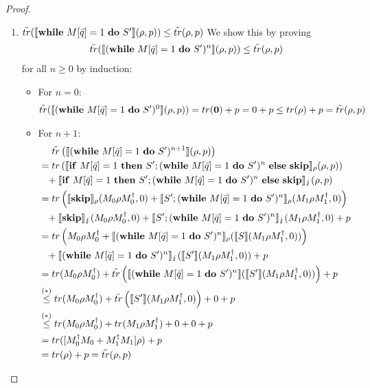 \documentclass[a4paper,UKenglish,cleveref, autoref, thm-restate]{lipics-v2021}
\begin{document}
\begin{proof}
\begin{itemize}
\begin{enumerate}
            \item $\tilde{tr}(\llbracket \mathbf{while } \text{ }M[\Bar{q}]=1 \text{ }\mathbf{ do } \text{ }S' \rrbracket(\rho,p))\leq \tilde{tr}(\rho,p)$ We show this by proving
            \begin{align*}
                \tilde{tr}(\llbracket (\mathbf{while } \text{ }M[\Bar{q}]=1 \text{ }\mathbf{ do } \text{ }S')^n \rrbracket(\rho,p)) \leq \tilde{tr}(\rho,p)
            \end{align*} for all $n\geq 0$ by induction:
            \begin{itemize}
                \item For $n=0$:
                \begin{align*}
                    \tilde{tr}(\llbracket (\mathbf{while } \text{ }M[\Bar{q}]=1 \text{ }\mathbf{ do } \text{ }S')^0 \rrbracket(\rho,p)) = tr(\mathbf{0}) + p =0+ p\leq tr(\rho)+p = \tilde{tr}(\rho,p)
                \end{align*}
                \item For $n+1$:
                \begin{align*}
                    &\phantom{=.}\tilde{tr}\left(\llbracket (\mathbf{while } \text{ }M[\Bar{q}]=1 \text{ }\mathbf{ do } \text{ }S')^{n+1} \rrbracket(\rho,p)\right)  \\
                    &= tr\left(\llbracket \mathbf{if} \text{ }M[\Bar{q}]=1 \text{ } \mathbf{then} \text{ } S'; (\mathbf{while } \text{ }M[\Bar{q}]=1 \text{ }\mathbf{ do } \text{ }S')^n \text{ } \mathbf{else} \text{ } \mathbf{skip} \rrbracket_{\rho}(\rho,p)\right) \\
                    &\phantom{=}+  \llbracket \mathbf{if} \text{ }M[\Bar{q}]=1 \text{ } \mathbf{then} \text{ } S'; (\mathbf{while } \text{ }M[\Bar{q}]=1 \text{ }\mathbf{ do } \text{ }S')^n \text{ } \mathbf{else} \text{ } \mathbf{skip} \rrbracket_{\lightning}(\rho,p) \\
                    &= tr\left(\llbracket \mathbf{skip} \rrbracket_{\rho} (M_0 \rho M_0 ^\dagger ,0) + \llbracket S';(\mathbf{while } \text{ }M[\Bar{q}]=1 \text{ }\mathbf{ do } \text{ }S')^n \rrbracket_{\rho} (M_1 \rho M_1 ^\dagger ,0) \right) \\
                    &\phantom{=}+ \llbracket \mathbf{skip} \rrbracket_{\lightning} (M_0 \rho M_0 ^\dagger ,0) + \llbracket S';(\mathbf{while } \text{ }M[\Bar{q}]=1 \text{ }\mathbf{ do } \text{ }S')^n \rrbracket_{\lightning} (M_1 \rho M_1 ^\dagger ,0) + p \\
                    &= tr\left(M_0 \rho M_0 ^\dagger + \llbracket (\mathbf{while } \text{ }M[\Bar{q}]=1 \text{ }\mathbf{ do } \text{ }S')^n \rrbracket_{\rho} (\llbracket S \rrbracket (M_1 \rho M_1 ^\dagger ,0))\right)\\
                    &\phantom{=} + \llbracket (\mathbf{while } \text{ }M[\Bar{q}]=1 \text{ }\mathbf{ do } \text{ }S')^n \rrbracket_{\lightning} (\llbracket S' \rrbracket (M_1 \rho M_1 ^\dagger ,0)) + p\\
                    &= tr(M_0 \rho M_0 ^\dagger) +  \tilde{tr}\left(\llbracket (\mathbf{while } \text{ }M[\Bar{q}]=1 \text{ }\mathbf{ do } \text{ }S')^n \rrbracket (\llbracket S' \rrbracket (M_1 \rho M_1 ^\dagger ,0))\right) + p\\
                    &\overset{(*)}{\leq} tr(M_0 \rho M_0 ^\dagger) + \tilde{tr }\left(\llbracket S' \rrbracket (M_1 \rho M_1 ^\dagger ,0)\right) + 0 +  p\\
                    &\overset{(*)}{\leq}  tr(M_0 \rho M_0 ^\dagger) + tr(M_1 \rho M_1 ^\dagger)+ 0+  0 + p\\
                    &= tr([M_0 ^\dagger M_0+ M_1 ^\dagger M_1]  \rho )+ p\\
                    &= tr(\rho)+p = \tilde{tr}(\rho,p)
                \end{align*}
            \end{itemize}


\end{enumerate}
\end{itemize}
\end{proof}
\end{document}
